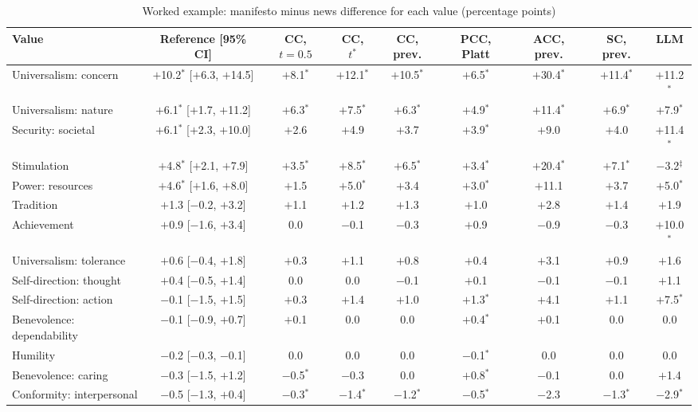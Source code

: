 \begin{table}[t]
\caption{Worked example: manifesto minus news difference for each value (percentage points)}
\label{tab:worked-values}
\centering
\scriptsize
\setlength{\tabcolsep}{3pt}
\begin{tabular*}{\textwidth}{@{\extracolsep{\fill}}lcccccccc@{}}
\toprule
Value & Reference [95\% CI] & CC, $t = 0.5$ & CC, $t^*$ & CC, prev. & PCC, Platt & ACC, prev. & SC, prev. & LLM \\
\midrule
Universalism: concern & $+$10.2$^*$ [$+$6.3, $+$14.5] & $+$8.1$^*$ & $+$12.1$^*$ & $+$10.5$^*$ & $+$6.5$^*$ & $+$30.4$^*$ & $+$11.4$^*$ & $+$11.2$^*$ \\
Universalism: nature & $+$6.1$^*$ [$+$1.7, $+$11.2] & $+$6.3$^*$ & $+$7.5$^*$ & $+$6.3$^*$ & $+$4.9$^*$ & $+$11.4$^*$ & $+$6.9$^*$ & $+$7.9$^*$ \\
Security: societal & $+$6.1$^*$ [$+$2.3, $+$10.0] & $+$2.6 & $+$4.9 & $+$3.7 & $+$3.9$^*$ & $+$9.0 & $+$4.0 & $+$11.4$^*$ \\
Stimulation & $+$4.8$^*$ [$+$2.1, $+$7.9] & $+$3.5$^*$ & $+$8.5$^*$ & $+$6.5$^*$ & $+$3.4$^*$ & $+$20.4$^*$ & $+$7.1$^*$ & $-$3.2$^\ddagger$ \\
Power: resources & $+$4.6$^*$ [$+$1.6, $+$8.0] & $+$1.5 & $+$5.0$^*$ & $+$3.4 & $+$3.0$^*$ & $+$11.1 & $+$3.7 & $+$5.0$^*$ \\
Tradition & $+$1.3 [$-$0.2, $+$3.2] & $+$1.1 & $+$1.2 & $+$1.3 & $+$1.0 & $+$2.8 & $+$1.4 & $+$1.9 \\
Achievement & $+$0.9 [$-$1.6, $+$3.4] & 0.0 & $-$0.1 & $-$0.3 & $+$0.9 & $-$0.9 & $-$0.3 & $+$10.0$^*$ \\
Universalism: tolerance & $+$0.6 [$-$0.4, $+$1.8] & $+$0.3 & $+$1.1 & $+$0.8 & $+$0.4 & $+$3.1 & $+$0.9 & $+$1.6 \\
Self-direction: thought & $+$0.4 [$-$0.5, $+$1.4] & 0.0 & 0.0 & $-$0.1 & $+$0.1 & $-$0.1 & $-$0.1 & $+$1.1 \\
Self-direction: action & $-$0.1 [$-$1.5, $+$1.5] & $+$0.3 & $+$1.4 & $+$1.0 & $+$1.3$^*$ & $+$4.1 & $+$1.1 & $+$7.5$^*$ \\
Benevolence: dependability & $-$0.1 [$-$0.9, $+$0.7] & $+$0.1 & 0.0 & 0.0 & $+$0.4$^*$ & $+$0.1 & 0.0 & 0.0 \\
Humility & $-$0.2 [$-$0.3, $-$0.1] & 0.0 & 0.0 & 0.0 & $-$0.1$^*$ & 0.0 & 0.0 & 0.0 \\
Benevolence: caring & $-$0.3 [$-$1.5, $+$1.2] & $-$0.5$^*$ & $-$0.3 & 0.0 & $+$0.8$^*$ & $-$0.1 & 0.0 & $+$1.4 \\
Conformity: interpersonal & $-$0.5 [$-$1.3, $+$0.4] & $-$0.3$^*$ & $-$1.4$^*$ & $-$1.2$^*$ & $-$0.5$^*$ & $-$2.3 & $-$1.3$^*$ & $-$2.9$^*$ \\

\end{tabular*}
\end{table}

